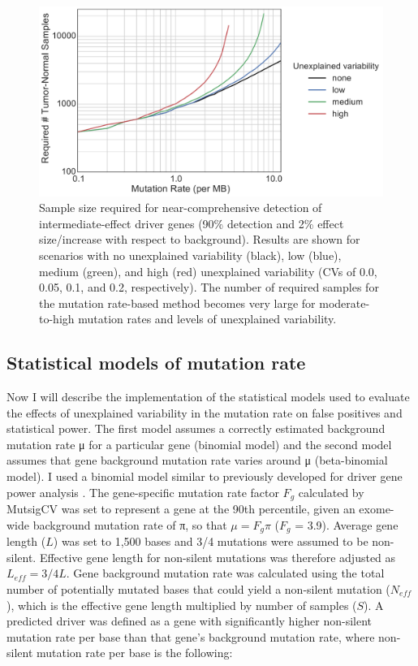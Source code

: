 \begin{figure}
  \centering
  \makeatletter
  \let\@currsize\normalsize
  \includegraphics[width=0.9\linewidth]{figures/chapter2/statistical_power.pdf}
  \caption[]{Sample size required for near-comprehensive detection of intermediate-effect driver genes (90\% detection and 2\% effect size/increase with respect to background). Results are shown for scenarios with no unexplained variability (black), low (blue), medium (green), and high (red) unexplained variability (CVs of 0.0, 0.05, 0.1, and 0.2, respectively). The number of required samples for the mutation rate-based method becomes very large for moderate-to-high mutation rates and levels of unexplained variability.}
  \label{fig:statistical_power}
\end{figure}

\subsection{Statistical models of mutation rate}

Now I will describe the implementation of the statistical models used to evaluate the effects of unexplained variability in the mutation rate on false positives and statistical power. The first model assumes a correctly estimated background mutation rate μ for a particular gene (binomial model) and the second model assumes that gene background mutation rate varies around μ (beta-binomial model). I used a binomial model similar to previously developed for driver gene power analysis \cite{RN14}. The gene-specific mutation rate factor $F_g$ calculated by MutsigCV \cite{RN14} was set to represent a gene at the 90th percentile, given an exome-wide background mutation rate of π, so that $μ=F_gπ$ ($F_g$ = 3.9). Average gene length ($L$) was set to 1,500 bases and 3/4 mutations were assumed to be non-silent. Effective gene length for non-silent mutations was therefore adjusted as $L_{eff}=3/4L$. Gene background mutation rate was calculated using the total number of potentially mutated bases that could yield a non-silent mutation ($N_{eff}$), which is the effective gene length multiplied by number of samples ($S$). A predicted driver was defined as a gene with significantly higher non-silent mutation rate per base than that gene's background mutation rate, where non-silent mutation rate per base is the following:

